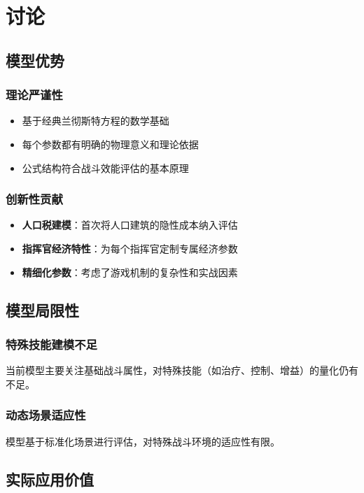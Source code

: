 \documentclass[a4paper,12pt]{article}
\begin{document}
\section{讨论}

\subsection{模型优势}

\subsubsection{理论严谨性}
\begin{itemize}
    \item 基于经典兰彻斯特方程的数学基础
    \item 每个参数都有明确的物理意义和理论依据
    \item 公式结构符合战斗效能评估的基本原理
\end{itemize}

\subsubsection{创新性贡献}
\begin{itemize}
    \item \textbf{人口税建模}：首次将人口建筑的隐性成本纳入评估
    \item \textbf{指挥官经济特性}：为每个指挥官定制专属经济参数
    \item \textbf{精细化参数}：考虑了游戏机制的复杂性和实战因素
\end{itemize}

\subsection{模型局限性}

\subsubsection{特殊技能建模不足}
当前模型主要关注基础战斗属性，对特殊技能（如治疗、控制、增益）的量化仍有不足。

\subsubsection{动态场景适应性}
模型基于标准化场景进行评估，对特殊战斗环境的适应性有限。

\subsection{实际应用价值}
\end{document}
